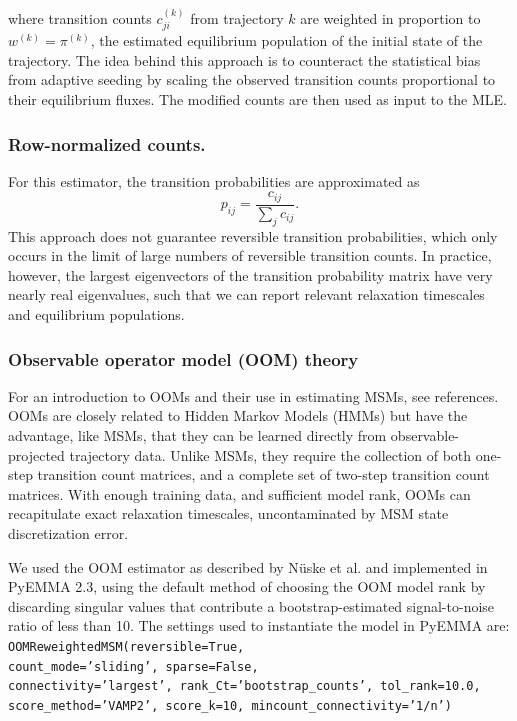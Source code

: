 \documentclass[%
 aip,
rsi,%
 amsmath,amssymb,
 reprint,%
]{revtex4-1}
\begin{document}
where transition counts $c_{ji}^{(k)}$ from trajectory $k$ are weighted in proportion to $w^{(k)} = \pi^{(k)}$, the estimated equilibrium population of the initial state of the trajectory.  The idea behind this approach is to counteract the statistical bias from adaptive seeding by scaling the observed transition counts proportional to their equilibrium fluxes. The modified counts are then used as input to the MLE.

\subsubsection*{Row-normalized counts.}
For this estimator, the transition probabilities are approximated as
\begin{equation}
p_{ij} = \frac{c_{ij}}{\sum_j c_{ij}}.
\end{equation}
This approach does not guarantee reversible transition probabilities, which only occurs in the limit of large numbers of reversible transition counts.  In practice, however, the largest eigenvectors of the transition probability matrix have very nearly real eigenvalues, such that we can report relevant relaxation timescales and equilibrium populations. 

\subsubsection*{Observable operator model (OOM) theory}

For an introduction to OOMs and their use in estimating MSMs, see references.\cite{Jaeger:2000ui,Wu:2015jda,Nuske:2017ex} OOMs are closely related to Hidden Markov Models (HMMs) but have the advantage, like MSMs, that they can be learned directly from observable-projected trajectory data.\cite{Wu:2015jda}  Unlike MSMs, they require the collection of both one-step transition count matrices, and a complete set of two-step transition count matrices. With enough training data, and sufficient model rank, OOMs can recapitulate exact relaxation timescales, uncontaminated by MSM state discretization error.\cite{Nuske:2017ex}

We used the OOM estimator as described by N{\"u}ske et al.\cite{Nuske:2017ex} and implemented in PyEMMA 2.3,\cite{Scherer:2015jb} using the default method of choosing the OOM model rank by discarding singular values that contribute a bootstrap-estimated signal-to-noise ratio of less than 10.  The settings used to instantiate the model in PyEMMA are: \texttt{
OOMReweightedMSM(reversible=True, \\ count{\_}mode='sliding', sparse=False, \\ connectivity='largest', rank{\_}Ct='bootstrap{\_}counts', tol{\_}rank=10.0, score{\_}method='VAMP2', score{\_}k=10, mincount{\_}connectivity='1/n')
}
\end{document}
